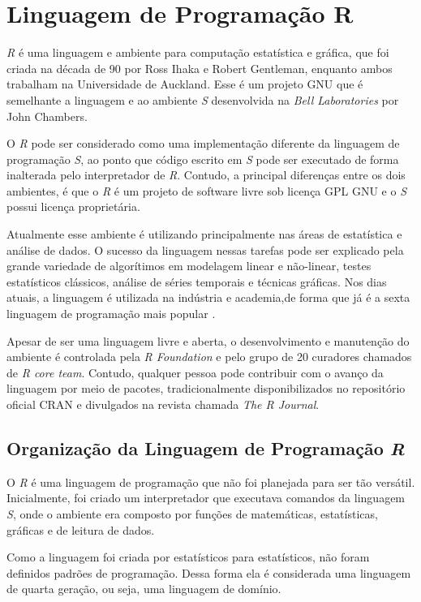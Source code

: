 
\chapter{Linguagem de Programação R}
\label{chap:RProgrammingLanguage}

\textit{R} é uma linguagem e ambiente para computação estatística e gráfica, que foi criada na década de 90 por Ross Ihaka e Robert Gentleman, enquanto ambos trabalham na Universidade de Auckland. Esse é um projeto GNU que é semelhante a linguagem e ao ambiente \textit{S} desenvolvida na \textit{Bell Laboratories} por John Chambers. 

O \textit{R} pode ser considerado como uma implementação diferente da linguagem de programação \textit{S}, ao ponto que código escrito em \textit{S} pode ser executado de forma inalterada pelo interpretador de \textit{R}. Contudo, a principal diferenças entre os dois ambientes, é que o \textit{R} é um projeto de software livre sob licença GPL GNU e o \textit{S} possui licença proprietária.

Atualmente esse ambiente é utilizando principalmente nas áreas de estatística e análise de dados. O sucesso da linguagem nessas tarefas pode ser explicado pela grande variedade de  algorítimos em modelagem linear e não-linear, testes estatísticos clássicos, análise de séries temporais e técnicas gráficas. Nos dias atuais, a linguagem é utilizada na indústria e academia,de forma que já é a sexta linguagem de programação mais popular \cite{Cass2017}.

Apesar de ser uma linguagem livre e aberta, o desenvolvimento e manutenção do ambiente é controlada pela \textit{R Foundation} e pelo grupo de 20 curadores chamados de \textit{R core team}. Contudo, qualquer pessoa pode contribuir com o avanço da linguagem por meio de pacotes, tradicionalmente disponibilizados no repositório oficial CRAN e divulgados na revista chamada \textit{The R Journal}.


\section{Organização da Linguagem de Programação \textit{R}}
O \textit{R} é uma linguagem de programação que não foi planejada para ser tão versátil. Inicialmente, foi criado um interpretador que executava comandos da linguagem \textit{S}, onde o ambiente era composto por funções de matemáticas, estatísticas, gráficas e de leitura de dados.

Como a linguagem foi criada por estatísticos para estatísticos, não foram definidos padrões de programação. Dessa forma ela é considerada uma linguagem de quarta geração, ou seja, uma linguagem de domínio.

